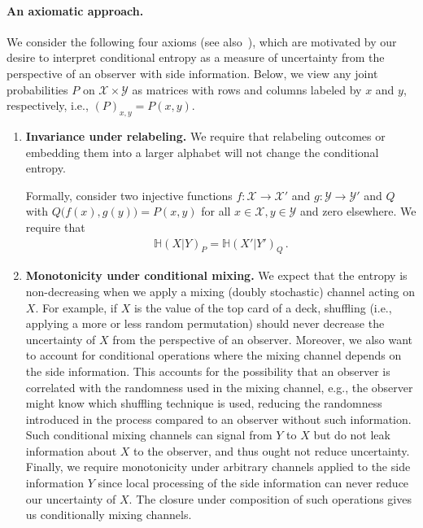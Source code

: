\documentclass[aps,pra,11pt,onecolumn,nofootinbib,tightenlines]{revtex4-2}
\theoremstyle{definition}
\renewcommand{\H}{\mathbb{H}}
\newcommand{\mc}[1]{\mathcal{#1}}
\begin{document}
\paragraph*{An axiomatic approach.}
We consider the following four axioms (see also~\cite{gour2018conditional,gour2024inevitability}), which are motivated by our desire to interpret conditional entropy as a measure of uncertainty from the perspective of an observer with side information. Below, we view any joint probabilities $P$ on $\mc{X}\times\mc Y$ as matrices with rows and columns labeled by $x$ and $y$, respectively, i.e.,
$(P)_{x,y} = P(x,y)$.
\begin{enumerate}
    \item \textbf{Invariance under relabeling.} We require that relabeling outcomes or embedding them into a larger alphabet will not change the conditional entropy.

    \smallskip

    Formally, consider two injective functions $f: \mc{X} \to \mc{X}'$ and $g: \mc{Y} \to \mc{Y}'$ and $Q$ with $Q\big(f(x),g(y)\big) = P(x,y)$ for all $x \in \mc{X}, y \in \mc{Y}$ and zero elsewhere. We require that
    \begin{align}
        \H(X|Y)_P = \H(X'|Y')_Q \,.
    \end{align}

\label{it: relabeling and embedding}
    \item \textbf{Monotonicity under conditional mixing.} We expect that the entropy is non-decreasing when we apply a mixing (doubly stochastic) channel acting on $X$. For example, if $X$ is the value of the top card of a deck, shuffling (i.e., applying a more or less random permutation) should never decrease the uncertainty of $X$ from the perspective of an observer.
    Moreover, we also want to account for conditional operations where the mixing channel depends on the side information. This accounts for the possibility that an observer is correlated with the randomness used in the mixing channel, e.g., the observer might know which shuffling technique is used, reducing the randomness introduced in the process compared to an observer without such information. Such conditional mixing channels can signal from $Y$ to $X$ but do not leak information about $X$ to the observer, and thus ought not reduce uncertainty.
    Finally, we require monotonicity under arbitrary channels applied to the side information $Y$ since local processing of the side information can never reduce our uncertainty of $X$.
    The closure under composition of such operations gives us conditionally mixing channels.


\end{enumerate}
\end{document}
